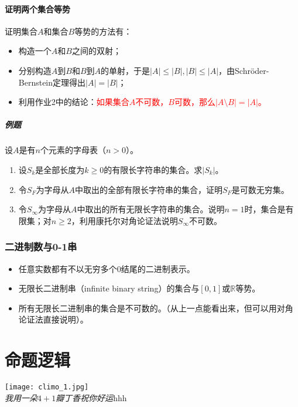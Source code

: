 \documentclass[b5paper,oneside]{ctexbook}
\newcommand{\Red}[1]{\textcolor[named]{red}{#1}}
\begin{document}
\subsubsection{证明两个集合等势}
证明集合$A$和集合$B$等势的方法有：
\begin{itemize}
\item 构造一个$A$和$B$之间的双射；
\item 分别构造$A$到$B$和$B$到$A$的单射，于是$|A|\leq |B|,|B|\leq |A|$，由Schr\"oder-Bernstein定理得出$|A|=|B|$；
\item 利用作业2中的结论：\Red{如果集合$A$不可数，$B$可数，那么$|A\setminus B|=|A|$。}
\end{itemize}
\paragraph{例题}设$A$是有$n$个元素的字母表（$n>0$）。\label{alphabet}
\begin{enumerate}
\item 设$S_k$是全部长度为$k\geq 0$的有限长字符串的集合。求$|S_k|$。
\item 令$S_F$为字母从$A$中取出的全部有限长字符串的集合，证明$S_F$是可数无穷集。
\item 令$S_\infty$为字母从$A$中取出的所有无限长字符串的集合。说明$n=1$时，集合是有限集；对$n\geq 2$，利用康托尔对角论证法说明$S_\infty$不可数。
\end{enumerate}
\subsection{二进制数与0-1串}
\begin{itemize}
\item 任意实数都有不以无穷多个0结尾的二进制表示。
\item 无限长二进制串（infinite binary string）的集合与$[0,1]$或$\mathbb{R}$等势。
\item 所有无限长二进制串的集合是不可数的。（从上一点能看出来，但可以用对角论证法直接说明）。
\end{itemize}
\chapter{命题逻辑}
\vspace*{\fill}
\begin{center}
\texttt{[image: climo\_1.jpg]}
\\\emph{我用一朵$4+1$瓣丁香祝你好运}hhh
\end{center}
\vspace*{\fill}
\clearpage
\end{document}
